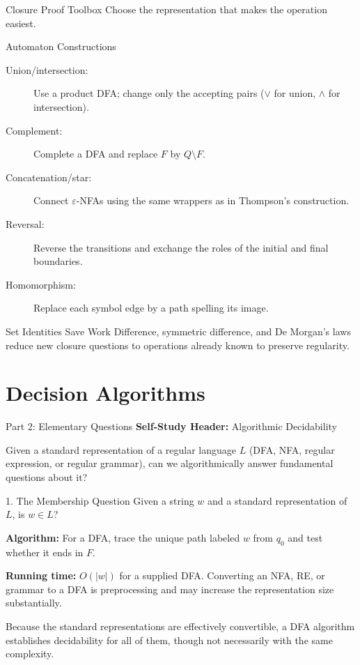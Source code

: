 \documentclass[10pt]{beamer}
\begin{document}
\begin{frame}{Closure Proof Toolbox}
  \small
  Choose the representation that makes the operation easiest.
  \begin{block}{Automaton Constructions}
    \begin{description}
      \item[Union/intersection:] Use a product DFA; change only the accepting
        pairs ($\lor$ for union, $\land$ for intersection).
      \item[Complement:] Complete a DFA and replace $F$ by $Q\setminus F$.
      \item[Concatenation/star:] Connect $\varepsilon$-NFAs using the same
        wrappers as in Thompson's construction.
      \item[Reversal:] Reverse the transitions and exchange the roles of the
        initial and final boundaries.
      \item[Homomorphism:] Replace each symbol edge by a path spelling its
        image.
    \end{description}
  \end{block}
  \pause
  \begin{exampleblock}{Set Identities Save Work}
    Difference, symmetric difference, and De Morgan's laws reduce new closure
    questions to operations already known to preserve regularity.
  \end{exampleblock}
\end{frame}

\section{Decision Algorithms}

\begin{frame}{Part 2: Elementary Questions}
  \small
  \textbf{Self-Study Header:} Algorithmic Decidability
  \vspace{0.2cm}
  
  Given a standard representation of a regular language $L$ (DFA, NFA,
  regular expression, or regular grammar), can we algorithmically answer
  fundamental questions about it?
  \pause
  
  \begin{block}{1. The Membership Question}
    Given a string $w$ and a standard representation of $L$, is $w \in L$?
    \par\smallskip
    \textbf{Algorithm:} For a DFA, trace the unique path labeled $w$ from
    $q_0$ and test whether it ends in $F$.

    \textbf{Running time:} $O(|w|)$ for a supplied DFA. Converting an NFA, RE,
    or grammar to a DFA is preprocessing and may increase the representation
    size substantially.
  \end{block}
  \pause
  Because the standard representations are effectively convertible, a DFA
  algorithm establishes decidability for all of them, though not necessarily
  with the same complexity.
\end{frame}
\end{document}
